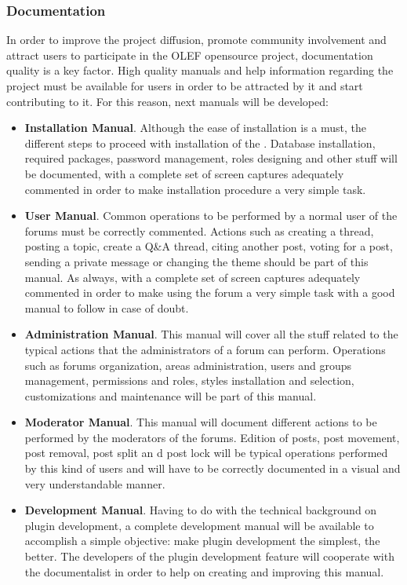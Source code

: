 \documentclass[11pt]{article}
\begin{document}
\subsubsection{Documentation}
In order to improve the project diffusion, promote community involvement and attract users to participate in the OLEF opensource project, documentation quality is a key factor. High quality manuals and help information regarding the project must be available for users in order to be attracted by it and start contributing to it. For this reason, next manuals will be developed:
\begin{itemize}\itemsep0pt
\item{\textbf{Installation Manual}}. Although the ease of installation is a must, the different steps to proceed with installation of the . Database installation, required packages, password management, roles designing and other stuff will be documented, with a complete set of screen captures adequately commented in order to make installation procedure a very simple task.
\item{\textbf{User Manual}}. Common operations to be performed by a normal user of the forums must be correctly commented. Actions such as creating a thread, posting a topic, create a Q\&A thread, citing another post, voting for a post, sending a private message or changing the theme should be part of this manual. As always, with a complete set of screen captures adequately commented in order to make using the forum a very simple task with a good manual to follow in case of doubt.
\item{\textbf{Administration Manual}}. This manual will cover all the stuff related to the typical actions that the administrators of a forum can perform. Operations such as forums organization, areas administration, users and groups management, permissions and roles, styles installation and selection, customizations and maintenance will be part of this manual.
\item{\textbf{Moderator Manual}}. This manual will document different actions to be performed by the moderators of the forums. Edition of posts, post movement, post removal, post split an d post lock will be typical operations performed by this kind of users and will have to be correctly documented in a visual and very understandable manner.
\item{\textbf{Development Manual}}. Having to do with the technical background on plugin development, a complete development manual will be available to accomplish a simple objective: make plugin development the simplest, the better. The developers of the plugin development feature will cooperate with the documentalist in order to help on creating and improving this manual.

\end{itemize}
\end{document}
